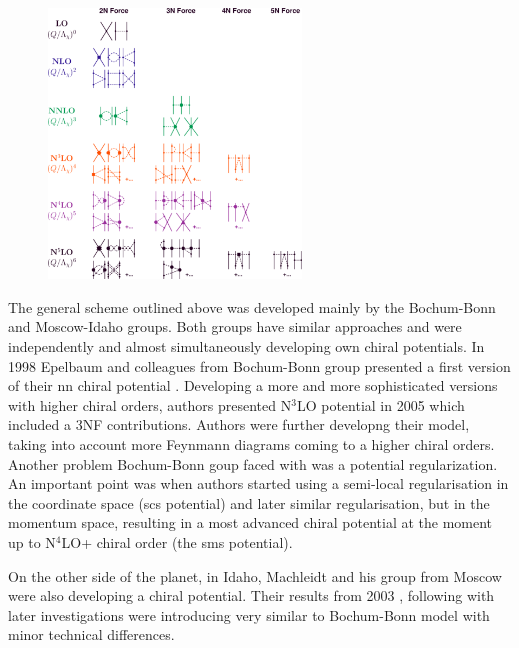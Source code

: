 \begin{figure}[h]
    \begin{center}
    \includegraphics[width=0.6\textwidth]{Figures/chiral.png}
    \end{center}
    \caption{}
    \label{proton_rad}
\end{figure}

The general scheme outlined above was developed mainly by the Bochum-Bonn and Moscow-Idaho groups.
Both groups have similar approaches and were independently and almost simultaneously
developing own chiral potentials. In 1998 Epelbaum and colleagues from Bochum-Bonn group 
presented a first version of their \gls{nn} chiral potential \cite{EPELBAOUM1998107, epelbaum2000two}.
Developing a more and more sophisticated versions with higher chiral orders, authors presented
N$^3$LO potential in 2005 \cite{epelbaum2005two} which included a 3NF contributions.
Authors were further developng their model, taking into account more Feynmann diagrams
coming to a higher chiral orders. Another problem Bochum-Bonn goup faced with was a potential regularization. An important point was when authors started using a semi-local regularisation 
in the coordinate space (\gls{scs} potential) \cite{Epelbaum2014SCS} and later similar regularisation, but in the momentum space, resulting in a most advanced chiral potential at the moment up to  
N$^4$LO+ chiral order \cite{reinkrebs2018} (the \gls{sms} potential).

On the other side of the planet, in Idaho, Machleidt and his group from Moscow were also developing 
a chiral potential. Their results from 2003 \cite{Entem2003}, following with later investigations \cite{Machleidt2005, Machleidt2010, Entem2017} were introducing very similar to Bochum-Bonn
model with minor technical differences.

